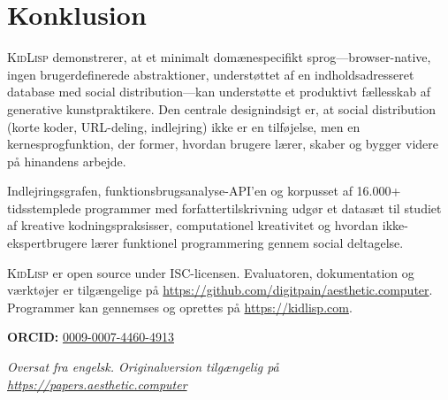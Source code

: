 \documentclass[10pt,letterpaper,twocolumn]{article}
\newcommand{\kidlisp}{\textsc{KidLisp}}
\begin{document}

\section{Konklusion}

\kidlisp{} demonstrerer, at et minimalt domænespecifikt sprog---browser-native, ingen brugerdefinerede abstraktioner, understøttet af en indholdsadresseret database med social distribution---kan understøtte et produktivt fællesskab af generative kunstpraktikere. Den centrale designindsigt er, at social distribution (korte koder, URL-deling, indlejring) ikke er en tilføjelse, men en kernesprogfunktion, der former, hvordan brugere lærer, skaber og bygger videre på hinandens arbejde.

Indlejringsgrafen, funktionsbrugsanalyse-API'en og korpusset af 16.000+ tidsstemplede programmer med forfattertilskrivning udgør et datasæt til studiet af kreative kodningspraksisser, computationel kreativitet og hvordan ikke-ekspertbrugere lærer funktionel programmering gennem social deltagelse.

\kidlisp{} er open source under ISC-licensen. Evaluatoren, dokumentation og værktøjer er tilgængelige på \url{https://github.com/digitpain/aesthetic.computer}. Programmer kan gennemses og oprettes på \url{https://kidlisp.com}.

\vspace{0.5em}
\noindent\textbf{ORCID:} \href{https://orcid.org/0009-0007-4460-4913}{0009-0007-4460-4913}

\vspace{0.5em}\noindent\textit{Oversat fra engelsk. Originalversion tilgængelig på \url{https://papers.aesthetic.computer}}




\end{document}
